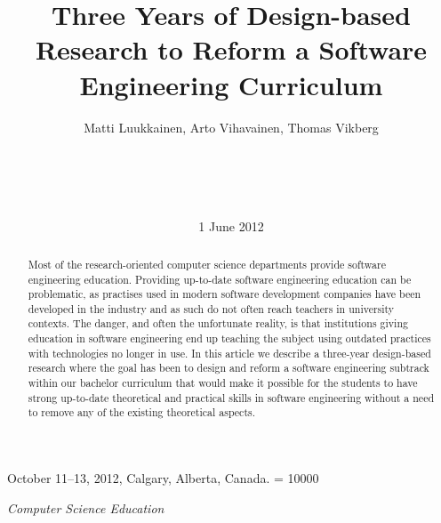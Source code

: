 \documentclass{sig-alternate}
\begin{document}
\setlength{\pdfpagewidth}{8.5in}
\setlength{\pdfpageheight}{11in}

 {October 11--13, 2012, Calgary, Alberta, Canada.}
\widowpenalty = 10000


\title{Three Years of Design-based Research to Reform a Software Engineering Curriculum}
\author{
\alignauthor
Matti Luukkainen, Arto Vihavainen, Thomas Vikberg\\
 \\
 \\
 \\
 \\
}

\date{1 June 2012}
\maketitle

\begin{abstract}
Most of the research-oriented computer science departments provide software engineering education. Providing up-to-date software engineering education can be problematic, as practises used in modern software development companies have been developed in the industry and as such do not often reach teachers in university contexts. The danger, and often the unfortunate reality, is that institutions giving education in software engineering end up teaching the subject using outdated practices with technologies no longer in use. In this article we describe a three-year design-based research where the goal has been to design and reform a software engineering subtrack within our bachelor curriculum that would make it possible for the students to have strong up-to-date theoretical and practical skills in software engineering without a need to remove any of the existing theoretical aspects.
\end{abstract}

{ {\em Computer Science Education}}
\end{document}
